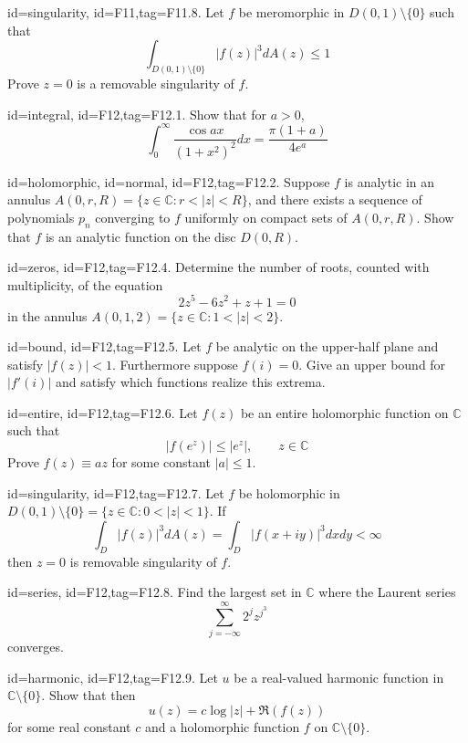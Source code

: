 \documentclass[12pt,letterpaper]{article}
\theoremstyle{plain}
\theoremstyle{definition}
\begin{document}
{\item[id=singularity, id=F11,tag=F11.8.]
Let $f$ be meromorphic in $D(0,1) \setminus \{0\}$ such that
\[
	\int_{D(0,1) \setminus \{0\}} | f(z) |^3 dA(z) \le 1
\]
Prove $z = 0$ is a removable singularity of $f$.


\item[id=integral, id=F12,tag=F12.1.]
Show that for $a > 0$,
\[
	\int_{0}^{\infty} \frac{\cos ax}{(1 + x^2)^2} dx = \frac{\pi(1+a)}{4 e^{a}}
\]

\item[id=holomorphic, id=normal, id=F12,tag=F12.2.]
Suppose $f$ is analytic in an annulus $A(0,r,R) = \{z \in \mathbb{C} \colon r < | z | < R\}$, and there exists a sequence of polynomials $p_n$ converging to $f$ uniformly on compact sets of $A(0,r,R)$. Show that $f$ is an analytic function on the disc $D(0,R)$. 

\item[id=zeros, id=F12,tag=F12.4.]
Determine the number of roots, counted with multiplicity, of the equation
\[
	2z^5 - 6z^2 + z + 1 = 0
\]
in the annulus $A(0,1,2) = \{z \in \mathbb{C} \colon 1 < | z | < 2\}$.
\item[id=bound, id=F12,tag=F12.5.]
Let $f$ be analytic on the upper-half plane and satisfy $| f(z) | < 1$. Furthermore suppose $f(i) = 0$. Give an upper bound for $| f'(i) |$ and satisfy which functions realize this extrema.

\item[id=entire, id=F12,tag=F12.6.]
Let $f(z)$ be an entire holomorphic function on $\mathbb{C}$ such that
\[
	| f(e^{z}) | \le | e^z |, \qquad z \in \mathbb{C}
\]
Prove $f(z) \equiv az$ for some constant $| a | \le 1$.
\item[id=singularity, id=F12,tag=F12.7.]
Let $f$ be holomorphic in $D(0,1) \setminus \{0\} = \{z \in \mathbb{C} \colon 0 < | z | < 1\}$. If
\[
	\int_{D} | f(z) |^3 dA(z) = \int_{D} | f(x+iy) |^3 dx dy < \infty
\]
then $z = 0$ is removable singularity of $f$.
\item[id=series, id=F12,tag=F12.8.]
Find the largest set in $\mathbb{C}$ where the Laurent series
\[
	\sum_{j=-\infty}^{\infty} 2^j z^{j^3}
\]
converges.
\item[id=harmonic, id=F12,tag=F12.9.]
Let $u$ be a real-valued harmonic function in $\mathbb{C} \setminus \{0\}$. Show that then
\[
	u(z) = c \log | z | + \Re (f(z))
\]
for some real constant $c$ and a holomorphic function $f$ on $\mathbb{C} \setminus \{0\}$.

}
\end{document}

